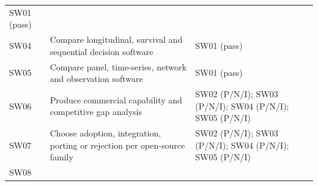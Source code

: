 \documentclass[
  11pt,
  a4paper,
]{article}
\begin{document}
\begin{longtable}[]{@{}lll@{}}
\begin{minipage}[t]{0.30\columnwidth}
SW01 (pass)\strut
\end{minipage}\tabularnewline
\begin{minipage}[t]{0.30\columnwidth}\raggedright
SW04\strut
\end{minipage} & \begin{minipage}[t]{0.30\columnwidth}\raggedright
Compare longitudinal, survival and sequential decision software\strut
\end{minipage} & \begin{minipage}[t]{0.30\columnwidth}\raggedright
SW01 (pass)\strut
\end{minipage}\tabularnewline
\begin{minipage}[t]{0.30\columnwidth}\raggedright
SW05\strut
\end{minipage} & \begin{minipage}[t]{0.30\columnwidth}\raggedright
Compare panel, time-series, network and observation software\strut
\end{minipage} & \begin{minipage}[t]{0.30\columnwidth}\raggedright
SW01 (pass)\strut
\end{minipage}\tabularnewline
\begin{minipage}[t]{0.30\columnwidth}\raggedright
SW06\strut
\end{minipage} & \begin{minipage}[t]{0.30\columnwidth}\raggedright
Produce commercial capability and competitive gap analysis\strut
\end{minipage} & \begin{minipage}[t]{0.30\columnwidth}\raggedright
SW02 (P/N/I); SW03 (P/N/I); SW04 (P/N/I); SW05 (P/N/I)\strut
\end{minipage}\tabularnewline
\begin{minipage}[t]{0.30\columnwidth}\raggedright
SW07\strut
\end{minipage} & \begin{minipage}[t]{0.30\columnwidth}\raggedright
Choose adoption, integration, porting or rejection per open-source
family\strut
\end{minipage} & \begin{minipage}[t]{0.30\columnwidth}\raggedright
SW02 (P/N/I); SW03 (P/N/I); SW04 (P/N/I); SW05 (P/N/I)\strut
\end{minipage}\tabularnewline
\begin{minipage}[t]{0.30\columnwidth}\raggedright
SW08\strut
\end{minipage} & \begin{minipage}[t]{0.30\columnwidth}\raggedright

\end{minipage}
\end{longtable}
\end{document}
